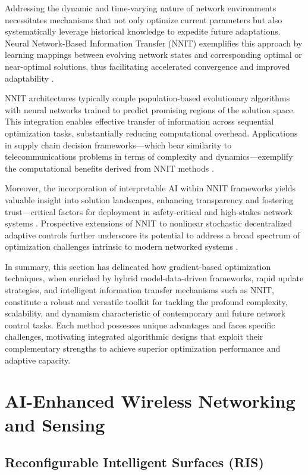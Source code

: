 \documentclass[sigconf]{acmart}
\begin{document}
Addressing the dynamic and time-varying nature of network environments necessitates mechanisms that not only optimize current parameters but also systematically leverage historical knowledge to expedite future adaptations. Neural Network-Based Information Transfer (NNIT) exemplifies this approach by learning mappings between evolving network states and corresponding optimal or near-optimal solutions, thus facilitating accelerated convergence and improved adaptability \cite{ref38,ref39,ref40,ref47}.

NNIT architectures typically couple population-based evolutionary algorithms with neural networks trained to predict promising regions of the solution space. This integration enables effective transfer of information across sequential optimization tasks, substantially reducing computational overhead. Applications in supply chain decision frameworks—which bear similarity to telecommunications problems in terms of complexity and dynamics—exemplify the computational benefits derived from NNIT methods \cite{ref38}.

Moreover, the incorporation of interpretable AI within NNIT frameworks yields valuable insight into solution landscapes, enhancing transparency and fostering trust—critical factors for deployment in safety-critical and high-stakes network systems \cite{ref39}. Prospective extensions of NNIT to nonlinear stochastic decentralized adaptive controls further underscore its potential to address a broad spectrum of optimization challenges intrinsic to modern networked systems \cite{ref40}.

In summary, this section has delineated how gradient-based optimization techniques, when enriched by hybrid model-data-driven frameworks, rapid update strategies, and intelligent information transfer mechanisms such as NNIT, constitute a robust and versatile toolkit for tackling the profound complexity, scalability, and dynamism characteristic of contemporary and future network control tasks. Each method possesses unique advantages and faces specific challenges, motivating integrated algorithmic designs that exploit their complementary strengths to achieve superior optimization performance and adaptive capacity.

\section{AI-Enhanced Wireless Networking and Sensing}

\subsection{Reconfigurable Intelligent Surfaces (RIS)}
\end{document}
